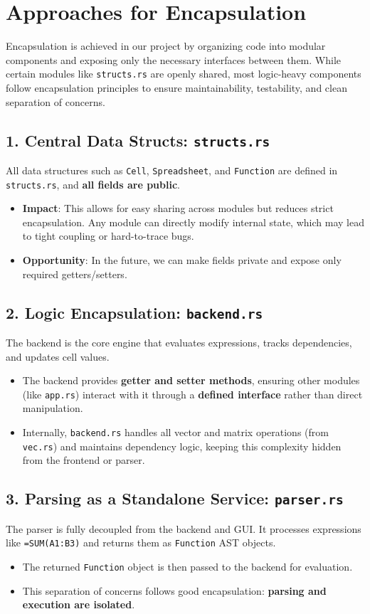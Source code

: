 \documentclass{article}
\begin{document}
\section*{Approaches for Encapsulation}

Encapsulation is achieved in our project by organizing code into modular components and exposing only the necessary interfaces between them. While certain modules like \texttt{structs.rs} are openly shared, most logic-heavy components follow encapsulation principles to ensure maintainability, testability, and clean separation of concerns.

\subsection*{1. Central Data Structs: \texttt{structs.rs}}
All data structures such as \texttt{Cell}, \texttt{Spreadsheet}, and \texttt{Function} are defined in \texttt{structs.rs}, and \textbf{all fields are public}.
\begin{itemize}
    \item \textbf{Impact}: This allows for easy sharing across modules but reduces strict encapsulation. Any module can directly modify internal state, which may lead to tight coupling or hard-to-trace bugs.
    \item \textbf{Opportunity}: In the future, we can make fields private and expose only required getters/setters.
\end{itemize}

\subsection*{2. Logic Encapsulation: \texttt{backend.rs}}
The backend is the core engine that evaluates expressions, tracks dependencies, and updates cell values.
\begin{itemize}
    \item The backend provides \textbf{getter and setter methods}, ensuring other modules (like \texttt{app.rs}) interact with it through a \textbf{defined interface} rather than direct manipulation.
    \item Internally, \texttt{backend.rs} handles all vector and matrix operations (from \texttt{vec.rs}) and maintains dependency logic, keeping this complexity hidden from the frontend or parser.
\end{itemize}

\subsection*{3. Parsing as a Standalone Service: \texttt{parser.rs}}
The parser is fully decoupled from the backend and GUI. It processes expressions like \texttt{=SUM(A1:B3)} and returns them as \texttt{Function} AST objects.
\begin{itemize}
    \item The returned \texttt{Function} object is then passed to the backend for evaluation.
    \item This separation of concerns follows good encapsulation: \textbf{parsing and execution are isolated}.
\end{itemize}
\end{document}
